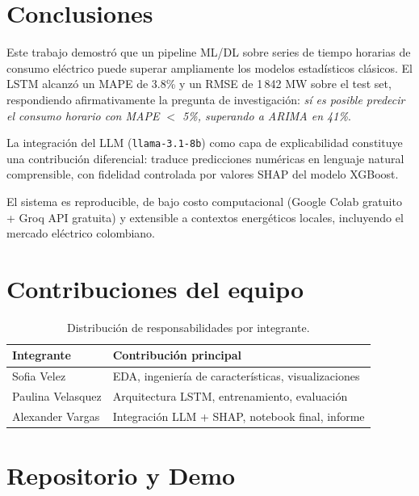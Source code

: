 \documentclass[10pt,twocolumn]{article}
\begin{document}
\section{Conclusiones}

Este trabajo demostró que un pipeline ML/DL sobre series
de tiempo horarias de consumo eléctrico puede superar
ampliamente los modelos estadísticos clásicos. El LSTM
alcanzó un MAPE de 3.8\% y un RMSE de 1\,842 MW sobre
el test set, respondiendo afirmativamente la pregunta de
investigación: \textit{sí es posible predecir el consumo
horario con MAPE $<$ 5\%, superando a ARIMA en 41\%}.

La integración del LLM (\texttt{llama-3.1-8b}) como capa
de explicabilidad constituye una contribución diferencial:
traduce predicciones numéricas en lenguaje natural comprensible,
con fidelidad controlada por valores SHAP del modelo XGBoost.

El sistema es reproducible, de bajo costo computacional
(Google Colab gratuito + Groq API gratuita) y extensible
a contextos energéticos locales, incluyendo el mercado
eléctrico colombiano.

\section*{Contribuciones del equipo}

\begin{table}[H]
\centering
\begin{tabular}{lp{4.8cm}}
\toprule
\textbf{Integrante} & \textbf{Contribución principal} \\
\midrule
Sofia Velez      & EDA, ingeniería de características, visualizaciones \\
Paulina Velasquez & Arquitectura LSTM, entrenamiento, evaluación \\
Alexander Vargas & Integración LLM + SHAP, notebook final, informe \\
\bottomrule
\end{tabular}
\caption*{Distribución de responsabilidades por integrante.}
\end{table}

\section*{Repositorio y Demo}
\end{document}
